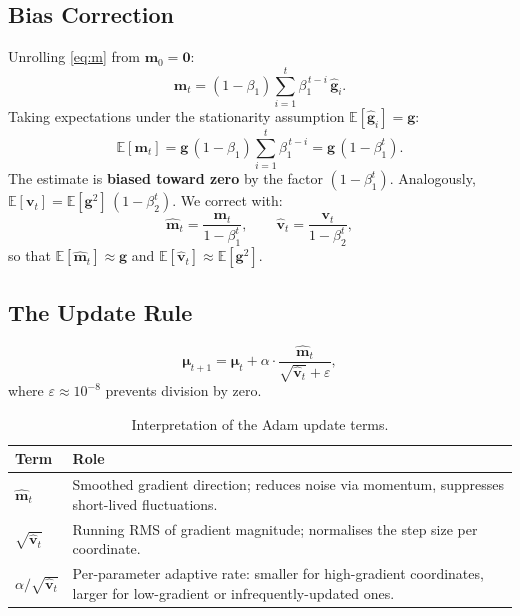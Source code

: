 \documentclass[12pt, a4paper]{article}
\newcommand{\bmu}{\boldsymbol{\mu}}
\newcommand{\mvec}{\mathbf{m}}           %
\newcommand{\vvec}{\mathbf{v}}           %
\newcommand{\mhat}{\hat{\mathbf{m}}}     %
\newcommand{\vhat}{\hat{\mathbf{v}}}     %
\newcommand{\EE}{\mathbb{E}}
\begin{document}
\subsection{Bias Correction}

Unrolling \eqref{eq:m} from $\mvec_0=\mathbf{0}$:
\begin{equation}
  \mvec_t = (1-\beta_1)\sum_{i=1}^{t}\beta_1^{\,t-i}\,\hat{\mathbf{g}}_i.
\end{equation}
Taking expectations under the stationarity assumption
$\EE[\hat{\mathbf{g}}_i]=\mathbf{g}$:
\begin{equation}
  \EE[\mvec_t]
  = \mathbf{g}\,(1-\beta_1)\sum_{i=1}^{t}\beta_1^{\,t-i}
  = \mathbf{g}\,(1-\beta_1^t).
\end{equation}
The estimate is \textbf{biased toward zero} by the factor $(1-\beta_1^t)$.
Analogously, $\EE[\vvec_t] = \EE[\mathbf{g}^2]\,(1-\beta_2^t)$.
We correct with:
\begin{equation}
  \mhat_t = \frac{\mvec_t}{1-\beta_1^t},
  \qquad
  \vhat_t = \frac{\vvec_t}{1-\beta_2^t},
\end{equation}
so that $\EE[\mhat_t]\approx\mathbf{g}$ and
$\EE[\vhat_t]\approx\EE[\mathbf{g}^2]$.

\subsection{The Update Rule}

\begin{keyresult}
  \begin{equation}
    \bmu_{t+1}
    = \bmu_t
      + \alpha\cdot
        \frac{\mhat_t}{\sqrt{\vhat_t}+\varepsilon},
    \label{eq:adam}
  \end{equation}
  where $\varepsilon\approx10^{-8}$ prevents division by zero.
\end{keyresult}

\begin{table}[ht]
  \centering
  \caption{Interpretation of the Adam update terms.}
  \label{tab:adam_terms}
  \begin{tabular}{@{}lp{9.5cm}@{}}
    \toprule
    \textbf{Term} & \textbf{Role} \\
    \midrule
    $\mhat_t$ &
      Smoothed gradient direction; reduces noise via momentum, suppresses
      short-lived fluctuations. \\[4pt]
    $\sqrt{\vhat_t}$ &
      Running RMS of gradient magnitude; normalises the step size
      per coordinate. \\[4pt]
    $\alpha/\sqrt{\vhat_t}$ &
      Per-parameter adaptive rate: smaller for high-gradient coordinates,
      larger for low-gradient or infrequently-updated ones. \\
    \bottomrule
  \end{tabular}
\end{table}
\end{document}
